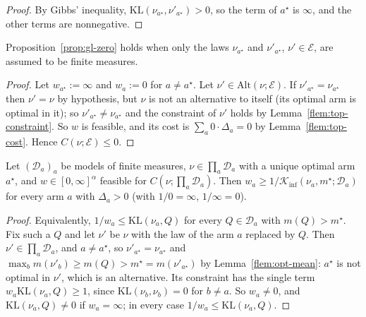 \documentclass[11pt]{article}
\newcommand{\KL}{\mathrm{KL}}
\newcommand{\Kinf}{\mathcal{K}_{\inf}}
\newcommand{\as}{a^{\star}}
\newcommand{\ms}{m^{\star}}
\newcommand{\Alt}{\mathrm{Alt}}
\newcommand{\GL}{C}
\newcommand{\mean}{m}
\newcommand{\gap}{\Delta}
\begin{document}
\begin{proof}
By Gibbs' inequality, $\KL(\nu_{\as},\nu'_{\as})>0$, so the term of $\as$ is $\infty$, and the
other terms are nonnegative.
\end{proof}

\begin{lemma}\label{flem:gl-zero}
Proposition~\ref{prop:gl-zero} holds when only the laws $\nu_{\as}$ and $\nu'_{\as}$,
$\nu'\in\mathcal E$, are assumed to be finite measures.
\end{lemma}

\begin{proof}
Let $w_{\as}:=\infty$ and $w_a:=0$ for $a\ne\as$. Let $\nu'\in\Alt(\nu;\mathcal E)$. If
$\nu'_{\as}=\nu_{\as}$ then $\nu'=\nu$ by hypothesis, but $\nu$ is not an alternative to itself
(its optimal arm is optimal in it); so $\nu'_{\as}\ne\nu_{\as}$ and the constraint of $\nu'$ holds
by Lemma~\ref{flem:top-constraint}. So $w$ is feasible, and its cost is
$\sum_a0\cdot\gap_a=0$ by Lemma~\ref{flem:top-cost}. Hence $\GL(\nu;\mathcal E)\le0$.
\end{proof}

\begin{lemma}\label{flem:weight-lower}
Let $(\mathcal D_a)_a$ be models of finite measures, $\nu\in\prod_a\mathcal D_a$ with a unique
optimal arm $\as$, and $w\in[0,\infty]^\alpha$ feasible for $\GL(\nu;\prod_a\mathcal D_a)$. Then
$w_a\ge1/\Kinf(\nu_a,\ms;\mathcal D_a)$ for every arm $a$ with $\gap_a>0$ (with $1/0=\infty$,
$1/\infty=0$).
\end{lemma}

\begin{proof}
Equivalently, $1/w_a\le\KL(\nu_a,Q)$ for every $Q\in\mathcal D_a$ with $\mean(Q)>\ms$. Fix such a
$Q$ and let $\nu'$ be $\nu$ with the law of the arm $a$ replaced by $Q$. Then
$\nu'\in\prod_a\mathcal D_a$, and $a\ne\as$, so $\nu'_{\as}=\nu_{\as}$ and
$\max_b\mean(\nu'_b)\ge\mean(Q)>\ms=\mean(\nu'_{\as})$ by Lemma~\ref{flem:opt-mean}: $\as$ is not
optimal in $\nu'$, which is an alternative. Its constraint has the single term
$w_a\KL(\nu_a,Q)\ge1$, since $\KL(\nu_b,\nu_b)=0$ for $b\ne a$. So $w_a\ne0$, and $\KL(\nu_a,Q)\ne0$
if $w_a=\infty$; in every case $1/w_a\le\KL(\nu_a,Q)$.
\end{proof}
\end{document}
